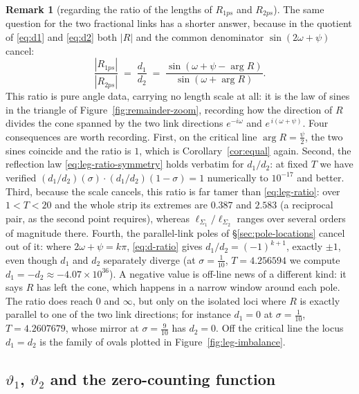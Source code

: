 \documentclass[11pt]{article}
\theoremstyle{definition}
\newtheorem{remark}[theorem]{Remark}
\begin{document}
\begin{remark}[regarding the ratio of the lengths of $R_{1ps}$ and $R_{2ps}$]\label{rem:d-ratio}
The same question for the two fractional links has a shorter answer, because in
the quotient of \eqref{eq:d1} and \eqref{eq:d2} both $|R|$ and the common
denominator $\sin(2\omega+\psi)$ cancel:
\begin{equation}\label{eq:d-ratio}
\frac{|R_{1ps}|}{|R_{2ps}|}
\;=\;
\frac{d_1}{d_2}
\;=\;
\frac{\sin(\omega+\psi-\arg R)}{\sin(\omega+\arg R)}.
\end{equation}
This ratio is pure angle data, carrying no length scale at all: it is the law
of sines in the triangle of Figure~\ref{fig:remainder-zoom}, recording how the
direction of $R$ divides the cone spanned by the two link directions
$e^{-i\omega}$ and $e^{\,i(\omega+\psi)}$. Four consequences are worth
recording. First, on the critical line $\arg R=\tfrac{\psi}{2}$, the two sines
coincide and the ratio is $1$, which is Corollary~\ref{cor:equal} again.
Second, the reflection law \eqref{eq:leg-ratio-symmetry} holds verbatim for
$d_1/d_2$: at fixed $T$ we have verified
$(d_1/d_2)(\sigma)\cdot(d_1/d_2)(1-\sigma)=1$ numerically to $10^{-17}$ and
better. Third, because the scale cancels, this ratio is far tamer than
\eqref{eq:leg-ratio}: over $1<T<20$ and the whole strip its extremes are
$0.387$ and $2.583$ (a reciprocal pair, as the second point requires), whereas
$\ell_{\Sigma_1}/\ell_{\Sigma_2}$ ranges over several orders of magnitude
there. Fourth, the parallel-link poles of \S\ref{sec:pole-locations} cancel out
of it: where $2\omega+\psi=k\pi$, \eqref{eq:d-ratio} gives
$d_1/d_2=(-1)^{k+1}$, exactly $\pm1$, even though $d_1$ and $d_2$ separately
diverge (at $\sigma=\tfrac1{10}$, $T=4.256594$ we compute
$d_1=-d_2\approx-4.07\times10^{36}$). A negative value is off-line news of a
different kind: it says $R$ has left the cone, which happens in a narrow window
around each pole. The ratio does reach $0$ and $\infty$, but only on the
isolated loci where $R$ is exactly parallel to one of the two link directions;
for instance $d_1=0$ at $\sigma=\tfrac1{10}$, $T=4.2607679$, whose mirror at
$\sigma=\tfrac9{10}$ has $d_2=0$. Off the critical line the locus $d_1=d_2$ is
the family of ovals plotted in Figure~\ref{fig:leg-imbalance}.
\end{remark}

\subsection{\texorpdfstring{$\vartheta_1$, $\vartheta_2$}{theta1, theta2} and
the zero-counting function}\label{sec:counting}
\end{document}
